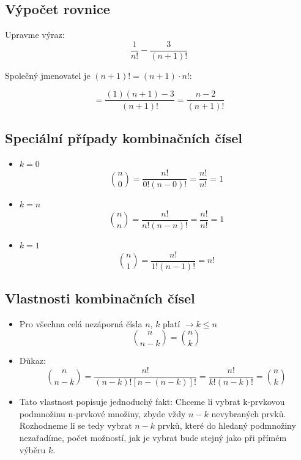      
\subsection{Výpočet rovnice}
Upravme výraz:
\[
\frac{1}{n!} - \frac{3}{(n+1)!}
\]

Společný jmenovatel je $(n+1)! = (n+1) \cdot n!$:

\[
= \frac{(1)(n+1) - 3}{(n+1)!} = \frac{n - 2}{(n+1)!}
\]

\subsection{Speciální případy kombinačních čísel}
     \begin{itemize}
         \item $k=0$
         $$
         {n \choose 0}=\frac{n!}{0!(n-0)!}=\frac{n!}{n!}=1
         $$
         \item $k=n$
         $$
         {n \choose n}=\frac{n!}{n!(n-n)!}=\frac{n!}{n!}=1
         $$
         \item $k=1$
         $$
         {n \choose 1}=\frac{n!}{1!(n-1)!}=n!
         $$
     \end{itemize}
     \subsection{Vlastnosti kombinačních čísel}
      \begin{itemize}
         \item Pro všechna celá nezáporná čísla $n$, $k$ platí $\rightarrow{k\leq n}$
         $$
         {n \choose n-k}={n \choose k}
         $$
         \item Důkaz:
         $$
         {n \choose n-k}=\frac{n!}{(n-k)![n-(n-k)]!}=\frac{n!}{k!(n-k)!}={n \choose k}
         $$
         \item Tato vlastnost popisuje jednoduchý fakt: Chceme li vybrat k-prvkovou podmnožinu n-prvkové množiny, zbyde vždy $n-k$ nevybraných prvků. Rozhodneme li se tedy vybrat $n-k$ prvků, které do hledaný podmnožiny nezařadíme, počet možností, jak je vybrat bude stejný jako při přímém výběru $k$.
     \end{itemize}
     